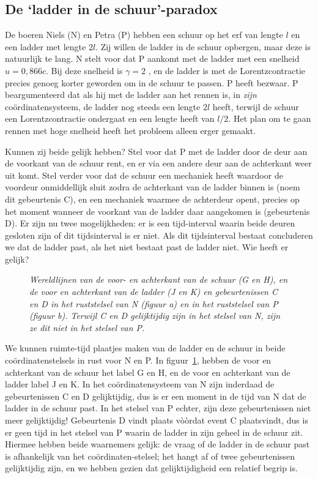 \subsection{De `ladder in de schuur'-paradox}
De boeren Niels (N) en Petra (P) hebben een schuur op het erf van
lengte $l$ en een ladder met lengte $2l$. Zij willen de ladder in de
schuur opbergen, maar deze is natuurlijk te lang. N stelt voor dat P
aankomt met de ladder met een snelheid $u=0,866c$. Bij deze snelheid
is $\gamma=2$ , en de ladder is met de Lorentzcontractie precies
genoeg korter geworden om in de schuur te passen. P heeft bezwaar. P
beargumenteerd dat als hij met de ladder aan het rennen is, in {\sl
zijn} co\"ordinatensysteem, de ladder nog steeds een lengte $2l$ heeft,
terwijl de schuur een Lorentzcontractie ondergaat en een lengte heeft
van $l/2$. Het plan om te gaan rennen met hoge snelheid heeft het
probleem alleen erger gemaakt.


Kunnen zij beide gelijk hebben? Stel voor dat P met de ladder
door de deur aan de voorkant van de schuur rent, en er via een andere
deur aan de achterkant weer uit komt. Stel verder voor dat de schuur
een mechaniek heeft waardoor de voordeur onmiddellijk sluit zodra de
achterkant van de ladder binnen is (noem dit gebeurtenis C), en een mechaniek waarmee de
achterdeur opent, precies op het moment wanneer de voorkant van de
ladder daar aangekomen is (gebeurtenis D). Er zijn nu twee
mogelijkheden: er is een tijd-interval waarin beide deuren gesloten
zijn of dit tijdsinterval is er
niet. Als dit tijdsinterval bestaat concluderen we dat de ladder past,
als het niet bestaat past de ladder niet. Wie heeft er gelijk?

\begin{figure}[ht] 
\centering
\caption{{\sl Wereldlijnen van de voor- en achterkant van de schuur (G en H), en de voor en achterkant van de ladder (J en K) en gebeurtenissen 
C en D in het ruststelsel van N (figuur a) en in het ruststelsel van P (figuur b). Terwijl C en D gelijktijdig zijn in het stelsel van N,
zijn ze dit niet in het stelsel van P.\label{f:schuur}}}
\end{figure}


We kunnen ruimte-tijd plaatjes maken van de ladder en de schuur in
beide co\"ordinatenstelsels in rust voor N en P. In
figuur~\ref{f:schuur}, hebben de voor en achterkant van de schuur het
label G en H, en de voor en achterkant van de ladder label J en K. In
het co\"ordinatensysteem van N zijn inderdaad de gebeurtenissen C en D
gelijktijdig, dus is er een moment in de tijd van N dat de ladder in
de schuur past. In het stelsel van P echter, zijn deze gebeurtenissen
niet meer gelijktijdig! Gebeurtenis D vindt plaats v\`o\`ordat event C
plaatsvindt, dus is er geen tijd in het stelsel van P waarin de ladder
in zijn geheel in de schuur zit. Hiermee hebben beide waarnemers gelijk: de
vraag of de ladder in de schuur past is afhankelijk van het co\"ordinaten-stelsel;
het hangt af of twee gebeurtenissen gelijktijdig
zijn, en we hebben gezien dat gelijktijdigheid een relatief begrip is.
